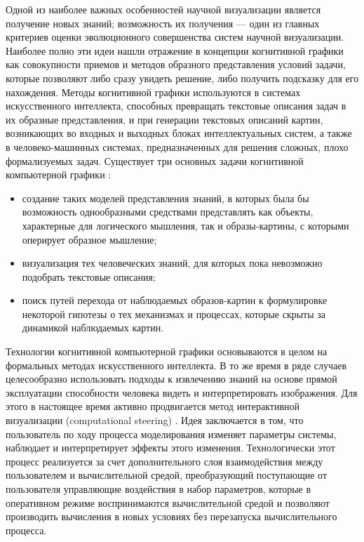 Одной из наиболее важных особенностей научной визуализации является получение новых знаний; возможность их получения --– один из главных критериев оценки эволюционного совершенства систем научной визуализации. Наиболее полно эти идеи нашли отражение в концепции когнитивной графики как совокупности приемов и методов образного представления условий задачи, которые позволяют либо сразу увидеть решение, либо получить подсказку для его нахождения. Методы когнитивной графики используются в системах искусственного интеллекта, способных превращать текстовые описания задач в их образные представления, и при генерации текстовых описаний картин, возникающих во входных и выходных блоках интеллектуальных систем, а также в человеко-машинных системах, предназначенных для решения сложных, плохо формализуемых задач. Существует три основных задачи когнитивной компьютерной графики \citep{dk65}:

\begin{itemize}
	\item	создание таких моделей представления знаний, в которых была бы 
			возможность однообразными средствами представлять как объекты, 
			характерные для логического мышления, так и образы-картины, с 
			которыми оперирует образное мышление;
	\item	визуализация тех человеческих знаний, для которых пока 
			невозможно подобрать текстовые описания;
	\item	поиск путей перехода от наблюдаемых образов-картин 
			к формулировке некоторой гипотезы о тех механизмах 
			и процессах, которые скрыты за динамикой наблюдаемых картин.
\end{itemize}

Технологии когнитивной компьютерной графики основываются в целом на формальных методах искусственного интеллекта. В то же время в ряде случаев целесообразно использовать подходы к извлечению знаний на основе прямой эксплуатации способности человека видеть и интерпретировать изображения. Для этого в настоящее время активно продвигается метод интерактивной визуализации (computational steering) \citep{dk66}\citep{dk67}. Идея заключается в том, что пользователь по ходу процесса моделирования изменяет параметры системы, наблюдает и интерпретирует эффекты этого изменения. Технологически этот процесс реализуется за счет дополнительного слоя взаимодействия между пользователем и вычислительной средой,  преобразующий поступающие от пользователя управляющие воздействия в набор параметров, которые в оперативном режиме воспринимаются вычислительной средой и позволяют производить вычисления в новых условиях без перезапуска вычислительного процесса.

